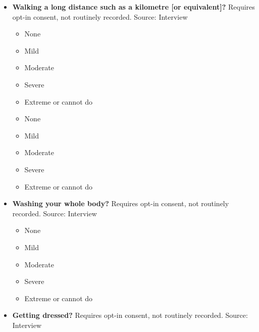 \documentclass[
]{scrartcl}
\providecommand{\tightlist}{%
  \setlength{\itemsep}{0pt}\setlength{\parskip}{0pt}}\usepackage{longtable,booktabs,array}
\begin{document}
\begin{itemize}
  \begin{itemize}
  \tightlist
  \item
    None
  \item
    Mild
  \item
    Moderate
  \item
    Severe
  \item
    Extreme or cannot do
  \item
    None
  \item
    Mild
  \item
    Moderate
  \item
    Severe
  \item
    Extreme or cannot do
  \end{itemize}
\item
  \textbf{Walking a long distance such as a kilometre {[}or
  equivalent{]}?} Requires opt-in consent, not routinely recorded.
  Source: Interview

  \begin{itemize}
  \tightlist
  \item
    None
  \item
    Mild
  \item
    Moderate
  \item
    Severe
  \item
    Extreme or cannot do
  \item
    None
  \item
    Mild
  \item
    Moderate
  \item
    Severe
  \item
    Extreme or cannot do
  \end{itemize}
\item
  \textbf{Washing your whole body?} Requires opt-in consent, not
  routinely recorded. Source: Interview

  \begin{itemize}
  \tightlist
  \item
    None
  \item
    Mild
  \item
    Moderate
  \item
    Severe
  \item
    Extreme or cannot do
  \end{itemize}
\item
  \textbf{Getting dressed?} Requires opt-in consent, not routinely
  recorded. Source: Interview


\end{itemize}
\end{document}
